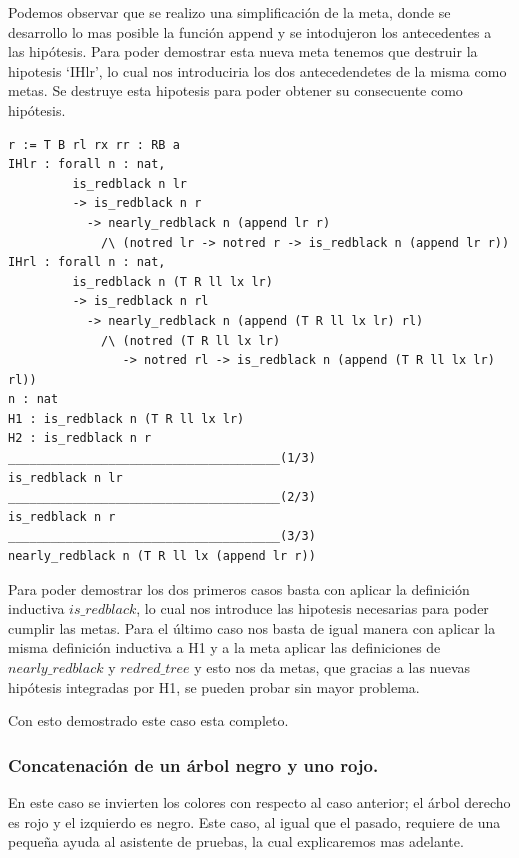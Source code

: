 \documentclass[8pt,leqno,pdflatex,spanish]{book}
\theoremstyle{plain}
\theoremstyle{definition}
\theoremstyle{remark}
\begin{document}
Podemos observar que se realizo una simplificaci\'on de la meta, donde se desarrollo lo mas
posible la funci\'on append y se intodujeron los antecedentes a las hip\'otesis. Para poder 
demostrar esta nueva meta tenemos que destruir la hipotesis `IHlr', lo cual nos introduciria los 
dos antecedendetes de la misma como metas. Se destruye esta hipotesis para poder obtener su consecuente como hip\'otesis.

\begin{verbatim}
r := T B rl rx rr : RB a
IHlr : forall n : nat,
         is_redblack n lr
         -> is_redblack n r
           -> nearly_redblack n (append lr r)
             /\ (notred lr -> notred r -> is_redblack n (append lr r))
IHrl : forall n : nat,
         is_redblack n (T R ll lx lr)
         -> is_redblack n rl
           -> nearly_redblack n (append (T R ll lx lr) rl)
             /\ (notred (T R ll lx lr)
                -> notred rl -> is_redblack n (append (T R ll lx lr) rl))
n : nat
H1 : is_redblack n (T R ll lx lr)
H2 : is_redblack n r
______________________________________(1/3)
is_redblack n lr
______________________________________(2/3)
is_redblack n r
______________________________________(3/3)
nearly_redblack n (T R ll lx (append lr r))
\end{verbatim}

Para poder demostrar los dos primeros casos basta con aplicar la definici\'on inductiva 
$is\_redblack$, lo cual nos introduce las hipotesis necesarias para poder cumplir las metas.
Para el \'ultimo caso nos basta de igual manera con aplicar la misma definici\'on inductiva a H1 y 
a la meta aplicar las definiciones de $nearly\_redblack$ y $redred\_tree$ y esto nos da metas, que 
gracias a las nuevas hip\'otesis integradas por H1, se pueden probar sin mayor problema.

Con esto demostrado este caso esta completo.

\subsubsection{Concatenaci\'on de un \'arbol negro y uno rojo.} 

En este caso se invierten los colores con respecto al caso anterior; el \'arbol derecho es rojo y 
el izquierdo es negro. Este caso, al igual que el pasado, requiere de una pequeña ayuda al 
asistente de pruebas, la cual explicaremos mas adelante.
\end{document}
